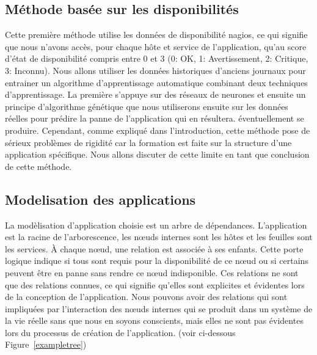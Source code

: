 \documentclass[10pt,a4paper,oneside]{article}
\begin{document}
\begin{multicols}{2}
\section{Méthode basée sur les disponibilités}
Cette première méthode utilise les données de disponibilité nagios, ce qui signifie que nous n’avons accès, pour chaque hôte et service de l’application, qu’au score d'état de disponibilité compris entre 0 et 3 (0: OK, 1: Avertissement, 2: Critique, 3: Inconnu). Nous allons utiliser les données historiques d'anciens journaux pour entrainer un algorithme d'apprentissage automatique combinant deux techniques d'apprentissage. La première s'appuye sur des réseaux de neurones et ensuite un principe d'algorithme génétique que nous utiliserons ensuite sur les données réelles pour prédire la panne de l'application qui en résultera. éventuellement se produire. Cependant, comme expliqué dans l'introduction, cette méthode pose de sérieux problèmes de rigidité car la formation est faite sur la structure d'une application spécifique. Nous allons discuter de cette limite en tant que conclusion de cette méthode.
\subsection{Modelisation des applications}
La modèlisation d'application choisie est un arbre de dépendances. L'application est la racine de l'arborescence, les nœuds internes sont les hôtes et les feuilles sont les services. À chaque nœud, une relation est associée à ses enfants. Cette porte logique indique si tous sont requis pour la disponibilité de ce nœud ou si certains peuvent être en panne sans rendre ce nœud indisponible. Ces relations ne sont que des relations connues, ce qui signifie qu’elles sont explicites et évidentes lors de la conception de l’application. Nous pouvons avoir des relations qui sont impliquées par l'interaction des nœuds internes qui se produit dans un système de la vie réelle sans que nous en soyons conscients, mais elles ne sont pas évidentes lors du processus de création de l'application. (voir ci-dessous Figure~\ref{exampletree})
\end{multicols}

\vspace{0.8cm}
\end{document}
